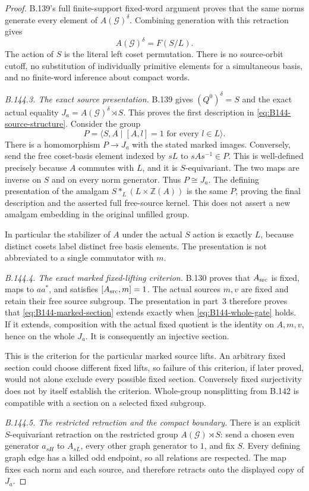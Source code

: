 \begin{proof}
B.139's full finite-support fixed-word argument proves that the same
norms generate every element of $A(\mathcal G)^\delta$.
Combining generation with this retraction gives
\[
 A(\mathcal G)^\delta=F(S/L).
\]
The action of $S$ is the literal left coset permutation. There is no
source-orbit cutoff, no substitution of individually primitive elements
for a simultaneous basis, and no finite-word inference about compact words.

\emph{B.144.3. The exact source presentation.}
B.139 gives $(Q^0)^\delta=S$ and the exact actual equality
$J_a=A(\mathcal G)^\delta\rtimes S$.
This proves the first description in \eqref{eq:B144-source-structure}.
Consider the group
\[
 P=\langle S,A\mid[A,l]=1\text{ for every }l\in L\rangle.
\]
There is a homomorphism $P\to J_a$ with the stated marked images.
Conversely, send the free coset-basis element indexed by $sL$ to
$sAs^{-1}\in P$. This is well-defined precisely because $A$
commutes with $L$, and it is $S$-equivariant. The two maps are inverse
on $S$ and on every norm generator. Thus $P\cong J_a$.
The defining presentation of the amalgam
$S*_{L}(L\times\mathbb Z(A))$ is the same $P$, proving the final
description and the asserted full free-source kernel. This does not
assert a new amalgam embedding in the original unfilled group.

In particular the stabilizer of $A$ under the actual $S$ action is
exactly $L$, because distinct cosets label distinct free basis elements.
The presentation is not abbreviated to a single commutator with $m$.

\emph{B.144.4. The exact marked fixed-lifting criterion.}
B.130 proves that $A_{\rm src}$ is fixed, maps to $aa^*$, and
satisfies $[A_{\rm src},m]=1$. The actual sources $m,v$ are fixed
and retain their free source subgroup. The presentation in part~3
therefore proves that \eqref{eq:B144-marked-section} extends exactly
when \eqref{eq:B144-whole-gate} holds. If it extends, composition
with the actual fixed quotient is the identity on $A,m,v$, hence
on the whole $J_a$. It is consequently an injective section.

This is the criterion for the particular marked source lifts.
An arbitrary fixed section could choose different fixed lifts, so
failure of this criterion, if later proved, would not alone exclude
every possible fixed section. Conversely fixed surjectivity does not
by itself establish the criterion. Whole-group nonsplitting from
B.142 is compatible with a section on a selected fixed subgroup.

\emph{B.144.5. The restricted retraction and the compact boundary.}
There is an explicit $S$-equivariant retraction on the restricted group
$A(\mathcal G)\rtimes S$: send a chosen even generator $a_{sH}$ to
$A_{sL}$, every other graph generator to $1$, and fix $S$.
Every defining graph edge has a killed odd endpoint, so all relations
are respected. The map fixes each norm and each source, and therefore
retracts onto the displayed copy of $J_a$.


\end{proof}
